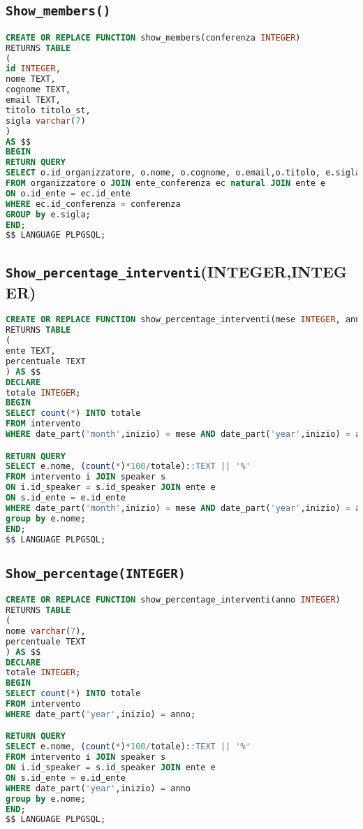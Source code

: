 \subsection{\texttt{Show\_members()}}
\begin{lstlisting}[language=SQL,style=mystyle]
CREATE OR REPLACE FUNCTION show_members(conferenza INTEGER)
RETURNS TABLE 
(
id INTEGER, 
nome TEXT, 
cognome TEXT, 
email TEXT,
titolo titolo_st, 
sigla varchar(7)
) 
AS $$
BEGIN
RETURN QUERY
SELECT o.id_organizzatore, o.nome, o.cognome, o.email,o.titolo, e.sigla
FROM organizzatore o JOIN ente_conferenza ec natural JOIN ente e  
ON o.id_ente = ec.id_ente
WHERE ec.id_conferenza = conferenza
GROUP by e.sigla;
END;
$$ LANGUAGE PLPGSQL;
\end{lstlisting}
\subsection{\texttt{Show\_percentage\_interventi}(INTEGER,INTEGER)}
\begin{lstlisting}[language=SQL,style=mystyle]
CREATE OR REPLACE FUNCTION show_percentage_interventi(mese INTEGER, anno INTEGER)
RETURNS TABLE
(
ente TEXT,
percentuale TEXT
) AS $$
DECLARE
totale INTEGER;
BEGIN
SELECT count(*) INTO totale
FROM intervento
WHERE date_part('month',inizio) = mese AND date_part('year',inizio) = anno;

RETURN QUERY
SELECT e.nome, (count(*)*100/totale)::TEXT || '%'
FROM intervento i JOIN speaker s 
ON i.id_speaker = s.id_speaker JOIN ente e 
ON s.id_ente = e.id_ente
WHERE date_part('month',inizio) = mese AND date_part('year',inizio) = anno
group by e.nome;
END;
$$ LANGUAGE PLPGSQL;
\end{lstlisting}
\subsection{\texttt{Show\_percentage(INTEGER)}}
\begin{lstlisting}[language=SQL,style=mystyle]
CREATE OR REPLACE FUNCTION show_percentage_interventi(anno INTEGER)
RETURNS TABLE
(
nome varchar(7),
percentuale TEXT
) AS $$
DECLARE
totale INTEGER;
BEGIN
SELECT count(*) INTO totale
FROM intervento
WHERE date_part('year',inizio) = anno;

RETURN QUERY
SELECT e.nome, (count(*)*100/totale)::TEXT || '%'
FROM intervento i JOIN speaker s 
ON i.id_speaker = s.id_speaker JOIN ente e 
ON s.id_ente = e.id_ente
WHERE date_part('year',inizio) = anno
group by e.nome;
END;
$$ LANGUAGE PLPGSQL;
\end{lstlisting}
